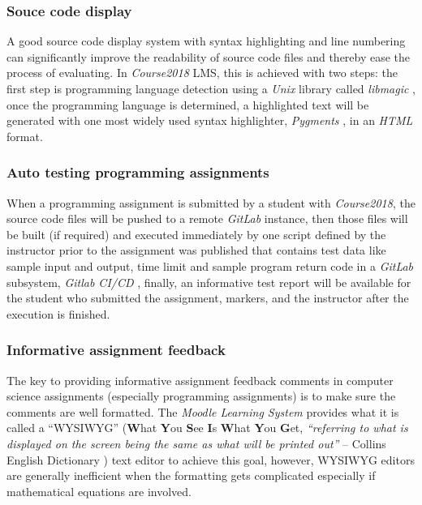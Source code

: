 \subsubsection{Souce code display}
A good source code display system with syntax highlighting and line numbering
can significantly improve the readability of source code files and thereby ease
the process of evaluating. In \emph{Course2018} LMS, this is achieved with two
steps: the first step is programming language detection using a \emph{Unix} library
called \emph{libmagic} \cite{libmagic}, once the programming language is
determined, a highlighted text will be generated with one most widely used
syntax highlighter, \emph{Pygments} \cite{pygments}, in an \emph{HTML} format.

\subsubsection{Auto testing programming assignments}
When a programming assignment is submitted by a student with \emph{Course2018},
the source code files will be pushed to a remote \emph{GitLab} instance, then
those files will be built (if required) and executed immediately by one script
defined by
the instructor prior to the assignment was published that contains test data
like sample input and output, time limit and sample program return code
in a \emph{GitLab} subsystem, \emph{Gitlab CI/CD} \cite{gitlabci},
finally, an informative test report
will be available for the student who submitted the assignment, markers, and
the instructor after the execution is finished.

\subsubsection{Informative assignment feedback}
The key to providing informative assignment feedback comments in computer
science assignments (especially programming assignments) is to make sure the
comments are well formatted.
The \emph{Moodle Learning System} provides what it is called a
{\hyphenchar{} ``WYSIWYG''}
(\textbf{W}hat \textbf{Y}ou \textbf{S}ee \textbf{I}s \textbf{W}hat
\textbf{Y}ou \textbf{G}et, 
\emph{``referring to what is displayed on the screen being the same as what
will be printed out''} -- Collins English Dictionary \cite{wysiwyg})
text editor to achieve this goal, however, WYSIWYG editors are generally
inefficient when the formatting gets complicated especially if mathematical
equations are involved.

